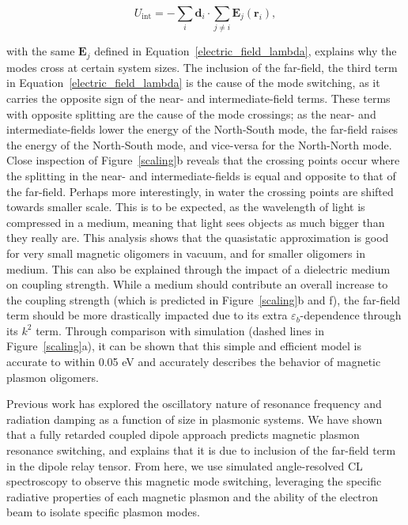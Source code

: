 \documentclass[journal=apchd5,manuscript=article]{achemso}
\begin{document}
\begin{equation}
U_{\textrm{int}} = -\sum_i \textbf{d}_i \cdot \sum_{j \neq i} \textbf{E}_j(\textbf{r}_i),
\label{interactionenergy}
\end{equation}

\noindent with the same $\textbf{E}_j$ defined in Equation~\ref{electric_field_lambda}, explains why the modes cross at certain system sizes. The inclusion of the far-field, the third term in Equation~\ref{electric_field_lambda} is the cause of the mode switching, as it carries the opposite sign of the near- and intermediate-field terms. These terms with opposite splitting are the cause of the mode crossings; as the near- and intermediate-fields lower the energy of the North-South mode, the far-field raises the energy of the North-South mode, and vice-versa for the North-North mode. Close inspection of Figure~\ref{scaling}b reveals that the crossing points occur where the splitting in the near- and intermediate-fields is equal and opposite to that of the far-field. Perhaps more interestingly, in water the crossing points are shifted towards smaller scale. This is to be expected, as the wavelength of light is compressed in a medium, meaning that light sees objects as much bigger than they really are. This analysis shows that the quasistatic approximation is good for very small magnetic oligomers in vacuum, and for smaller oligomers in medium. This can also be explained through the impact of a dielectric medium on coupling strength. While a medium should contribute an overall increase to the coupling strength (which is predicted in Figure~\ref{scaling}b and f), the far-field term should be more drastically impacted due to its extra $\varepsilon_b$-dependence through its $k^2$ term.\cite{Elsayed2008} Through comparison with simulation (dashed lines in Figure~\ref{scaling}a), it can be shown that this simple and efficient model is accurate to within 0.05 eV and accurately describes the behavior of magnetic plasmon oligomers.

Previous work has explored the oscillatory nature of resonance frequency and radiation damping as a function of size in plasmonic systems\cite{vonPlessen2007}. We have shown that a fully retarded coupled dipole approach predicts magnetic plasmon resonance switching, and explains that it is due to inclusion of the far-field term in the dipole relay tensor. From here, we use simulated angle-resolved CL spectroscopy to observe this magnetic mode switching, leveraging the specific radiative properties of each magnetic plasmon and the ability of the electron beam to isolate specific plasmon modes.
\end{document}
